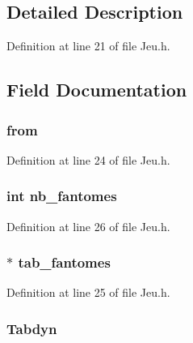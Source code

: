\subsection{Detailed Description}


Definition at line 21 of file Jeu.\-h.



\subsection{Field Documentation}
\hypertarget{struct_jeu_ad750813cc55d2f02672d8197594350d4}{
\subsubsection[{from}]{ from}}\label{struct_jeu_ad750813cc55d2f02672d8197594350d4}


Definition at line 24 of file Jeu.\-h.

\hypertarget{struct_jeu_a2af79f2e5c4d4e38523422de3a02f380}{
\subsubsection[{nb\-\_\-fantomes}]{\setlength{\rightskip}{0pt plus 5cm}int nb\-\_\-fantomes}}\label{struct_jeu_a2af79f2e5c4d4e38523422de3a02f380}


Definition at line 26 of file Jeu.\-h.

\hypertarget{struct_jeu_aacb99c7d77e7b2be482dbf4be9d7f7cd}{
\subsubsection[{tab\-\_\-fantomes}]{$\ast$ tab\-\_\-fantomes}}\label{struct_jeu_aacb99c7d77e7b2be482dbf4be9d7f7cd}


Definition at line 25 of file Jeu.\-h.

\hypertarget{struct_jeu_ac3c24a0cc9b72986a66bd7cd89c36b98}{
\subsubsection[{Tabdyn}]{ Tabdyn}}\label{struct_jeu_ac3c24a0cc9b72986a66bd7cd89c36b98}


